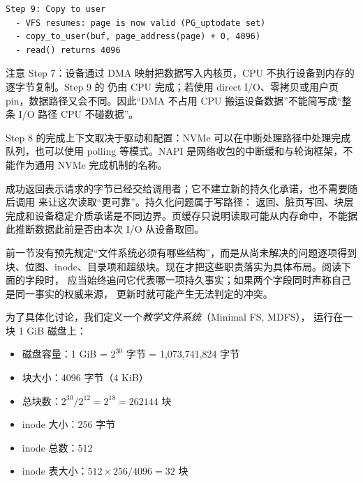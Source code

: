 \begin{filesystemlayout}
\begin{lstlisting}
Step 9: Copy to user
  - VFS resumes: page is now valid (PG_uptodate set)
  - copy_to_user(buf, page_address(page) + 0, 4096)
  - read() returns 4096
\end{lstlisting}

注意 Step 7：设备通过 DMA 映射把数据写入内核页，CPU 不执行设备到内存的逐字节复制。Step 9 的  仍由 CPU 完成；若使用 direct I/O、零拷贝或用户页 pin，数据路径又会不同。因此“DMA 不占用 CPU 搬运设备数据”不能简写成“整条 I/O 路径 CPU 不碰数据”。

Step 8 的完成上下文取决于驱动和配置：NVMe 可以在中断处理路径中处理完成队列，也可以使用 polling 等模式。NAPI 是网络收包的中断缓和与轮询框架，不能作为通用 NVMe 完成机制的名称。

\begin{warningbox}
 成功返回表示请求的字节已经交给调用者；它不建立新的持久化承诺，也不需要随后调用  来让这次读取“更可靠”。持久化问题属于写路径： 返回、脏页写回、块层完成和设备稳定介质承诺是不同边界。页缓存只说明读取可能从内存命中，不能据此推断数据此前是否由本次 I/O 从设备取回。
\end{warningbox}


\fi


前一节没有预先规定“文件系统必须有哪些结构”，而是从尚未解决的问题逐项得到
块、位图、inode、目录项和超级块。现在才把这些职责落实为具体布局。阅读下面的字段时，
应当始终追问它代表哪一项持久事实；如果两个字段同时声称自己是同一事实的权威来源，
更新时就可能产生无法判定的冲突。


为了具体化讨论，我们定义一个\emph{教学文件系统}（Minimal FS, MDFS），
运行在一块 1 GiB 磁盘上：

\begin{itemize}\tightlist
\item 磁盘容量：1 GiB = $2^{30}$ 字节 = 1,073,741,824 字节
\item 块大小：4096 字节（4 KiB）
\item 总块数：$2^{30} / 2^{12} = 2^{18} = 262144$ 块
\item inode 大小：256 字节
\item inode 总数：512
\item inode 表大小：$512 \times 256 / 4096 = 32$ 块
\end{itemize}


\end{filesystemlayout}
